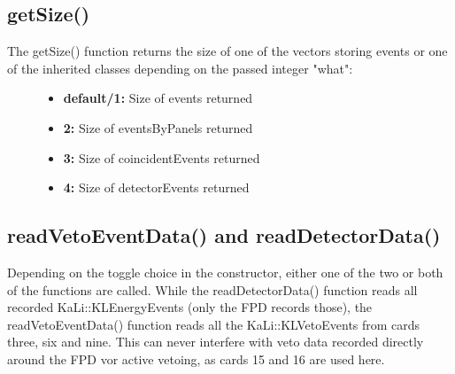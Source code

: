     \subsection{getSize()}
    \label{ch:Analysis software:sec:methods of the class run:subsec:getSize()}
    The getSize() function returns the size of one of the vectors storing events or one of the inherited classes depending on the passed integer "what":
    \begin{figure}
    	\begin{itemize}
		
    		\item {\bf default/1:} Size of events returned
    		\item {\bf 2:} Size of eventsByPanels returned
    		\item {\bf 3:} Size of coincidentEvents returned
    		\item {\bf 4:} Size of detectorEvents returned
    	\end{itemize}

    \end{figure}

    
    \subsection{readVetoEventData() and readDetectorData()}
    \label{ch:Analysis software:sec:methods of the class run:subsec:Member Functions readVetoEventData() and readDetectorData()}
    Depending on the toggle choice in the constructor, either one of the two or both of the functions are called. While the readDetectorData() function reads all recorded KaLi::\-KLEnergy\-Events (only the FPD records those), the readVetoEventData() function reads all the KaLi::KLVetoEvents from cards three, six and nine. This can never interfere with veto data recorded directly around the FPD vor active vetoing, as cards 15 and 16 are used here. 

    
    
    
    
    
      